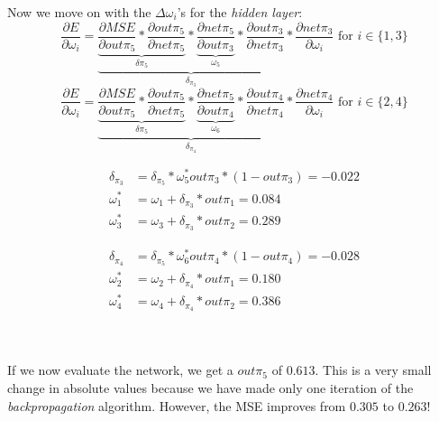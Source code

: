 Now we move on with the $\Delta\omega_i$'s for the \textit{hidden layer}:
\begin{equation*}
	\frac{\partial E}{\partial \omega_i}=\underbrace{\underbrace{\frac{\partial MSE}{\partial out\pi_5}*\frac{\partial out\pi_5}{\partial net\pi_5}}_{\delta\pi_5}*\underbrace{\frac{\partial net\pi_5}{\partial out\pi_3}}_{\omega_5}*\frac{\partial out\pi_3}{\partial net\pi_3}}_{\delta_{\pi_3}}*\frac{\partial net\pi_3}{\partial \omega_i}\text{ for }i\in\{1,3\}
\end{equation*}
\begin{equation*}
	\frac{\partial E}{\partial \omega_i}=\underbrace{\underbrace{\frac{\partial MSE}{\partial out\pi_5}*\frac{\partial out\pi_5}{\partial net\pi_5}}_{\delta\pi_5}*\underbrace{\frac{\partial net\pi_5}{\partial out\pi_4}}_{\omega_6}*\frac{\partial out\pi_4}{\partial net\pi_4}}_{\delta_{\pi_4}}*\frac{\partial net\pi_4}{\partial \omega_i}\text{ for }i\in\{2,4\}
\end{equation*}

\noindent\begin{minipage}{.5\linewidth}
	\begin{align*} 
		\delta_{\pi_3} &= \delta_{\pi_5}*\omega_5^*out\pi_3*(1-out\pi_3)=-0.022\\ 
		\omega_1^* &= \omega_1+\delta_{\pi_3}*out\pi_1=0.084 \\
		\omega_3^* &= \omega_3+\delta_{\pi_3}*out\pi_2=0.289
	\end{align*}
\end{minipage}%
\begin{minipage}{.5\linewidth}
	\begin{align*} 
		\delta_{\pi_4} &= \delta_{\pi_5}*\omega_6^*out\pi_4*(1-out\pi_4)=-0.028\\ 
		\omega_2^* &= \omega_2+\delta_{\pi_4}*out\pi_1=0.180 \\
		\omega_4^* &= \omega_4+\delta_{\pi_4}*out\pi_2=0.386
	\end{align*}
\end{minipage}\\
\\
If we now evaluate the network, we get a $out\pi_5$ of $0.613$. This is a very small change in absolute values because we have made only one iteration of the \textit{backpropagation} algorithm. However, the MSE improves from $0.305$ to $0.263$!

